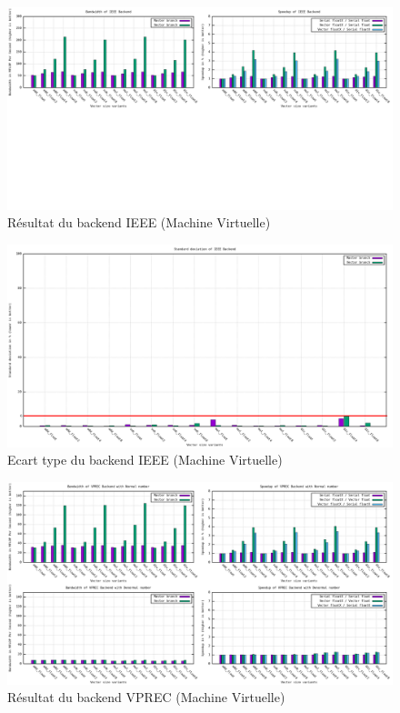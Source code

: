 \documentclass[11pt, letterpaper]{article}
\begin{document}
\label{orged2c8aa}
\begin{figure}[htbp]
\centering
\includegraphics[width=450px]{../ressources/vm_ieee.png}
\caption{\label{fig:orgd524bbc}Résultat du backend IEEE (Machine Virtuelle)}
\end{figure}

\label{org57a593b}
\begin{figure}[htbp]
\centering
\includegraphics[width=450px]{../ressources/vm_ieee_stddev.png}
\caption{\label{fig:orge502ce3}Ecart type du backend IEEE (Machine Virtuelle)}
\end{figure}

\label{org94461de}
\begin{figure}[htbp]
\centering
\includegraphics[width=450px]{../ressources/vm_vprec.png}
\caption{\label{fig:orgffc052d}Résultat du backend VPREC (Machine Virtuelle)}
\end{figure}
\end{document}
